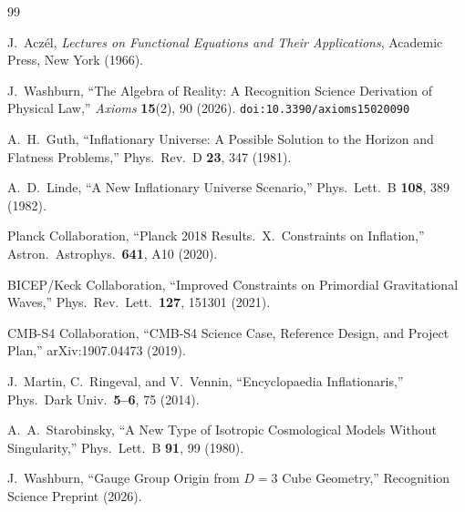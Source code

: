 \documentclass[12pt,a4paper]{article}
\theoremstyle{definition}
\theoremstyle{remark}
\begin{document}
\begin{thebibliography}{99}

J.~Acz\'el, \textit{Lectures on Functional Equations and Their
Applications}, Academic Press, New York (1966).

J.~Washburn, ``The Algebra of Reality: A Recognition Science Derivation
of Physical Law,'' \emph{Axioms} \textbf{15}(2), 90 (2026).
\texttt{doi:10.3390/axioms15020090}

A.~H.~Guth, ``Inflationary Universe: A Possible Solution to
the Horizon and Flatness Problems,'' Phys.\ Rev.\ D
\textbf{23}, 347 (1981).

A.~D.~Linde, ``A New Inflationary Universe Scenario,'' Phys.\
Lett.\ B \textbf{108}, 389 (1982).

Planck Collaboration, ``Planck 2018 Results.\ X.\ Constraints
on Inflation,'' Astron.\ Astrophys.\ \textbf{641}, A10 (2020).

BICEP/Keck Collaboration, ``Improved Constraints on Primordial
Gravitational Waves,'' Phys.\ Rev.\ Lett.\ \textbf{127},
151301 (2021).

CMB-S4 Collaboration, ``CMB-S4 Science Case, Reference Design,
and Project Plan,'' arXiv:1907.04473 (2019).

J.~Martin, C.~Ringeval, and V.~Vennin, ``Encyclopaedia
Inflationaris,'' Phys.\ Dark Univ.\ \textbf{5--6}, 75 (2014).

A.~A.~Starobinsky, ``A New Type of Isotropic Cosmological
Models Without Singularity,'' Phys.\ Lett.\ B \textbf{91}, 99
(1980).

J.~Washburn, ``Gauge Group Origin from $D = 3$ Cube
Geometry,'' Recognition Science Preprint (2026).

\end{thebibliography}
\end{document}
